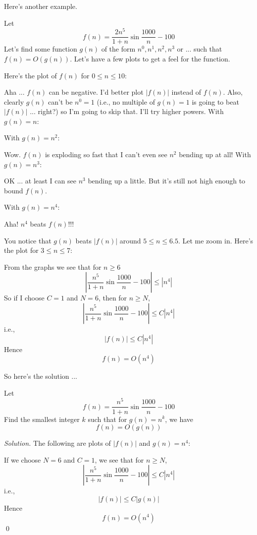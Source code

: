 Here's another example.

Let
\[
f(n) = \frac{2n^5}{1 + n} \sin \frac{1000}{n} - 100
\]
Let's find some function $g(n)$ of the form $n^0, n^1, n^2, n^3$ or ...
such that $f(n) = O(g(n))$.
Let's have a few plots to get a feel for the function.

Here's the plot of $f(n)$ for $0 \leq n \leq 10$:

Aha ... $f(n)$ can be negative.
I'd better plot $|f(n)|$ instead of $f(n)$.
Also, clearly $g(n)$ can't be $n^0 = 1$ (i.e., no multiple of
$g(n) = 1$ is going to beat $|f(n)|$ ... right?) 
so I'm going to skip that.
I'll try higher powers.
With $g(n) = n$:


With $g(n) = n^2$:

Wow. $f(n)$ is exploding so fast that I can't even see $n^2$ bending up at
all!
With $g(n) = n^3$:

OK ... at least I can see $n^3$ bending up a little. 
But it's still not high enough to bound $f(n)$.


With $g(n) = n^4$:

Aha! $n^4$ beats $f(n)$!!!

%

You notice that $g(n)$ beats $|f(n)|$ around 
$5 \leq n \leq 6.5$.
Let me zoom in.
Here's the plot for $3 \leq n \leq 7$:


From the graphs we see that for $n \geq 6$
\[
\left| 
\frac{n^5}{1 + n} \sin \frac{1000}{n} - 100
\right| 
\leq 
\left|
n^4
\right|
\]
So if I choose $C = 1$ and $N = 6$, then for $n \geq N$,
\[
\left|
\frac{n^5}{1 + n} \sin \frac{1000}{n} - 100
\right| 
\leq C
\left|
n^4
\right|
\]
i.e.,
\[
|f(n)| \leq C|n^4|
\]
Hence
\[
f(n) = O(n^4)
\]

So here's the solution ...

\newpage

\begin{eg}
Let 
\[ 
f(n) = \frac{n^5}{1 + n} \sin \frac{1000}{n} - 100
\]
Find the smallest integer $k$ such that for $g(n) = n^k$, we have
\[
f(n) = O(g(n))
\]
\end{eg}

\textit{Solution.}
The following are plots of $|f(n)|$ and $g(n) = n^4$:


If we choose $N = 6$ and $C = 1$,
we see that for $n \geq N$,
\[
\left|
\frac{n^5}{1 + n} \sin \frac{1000}{n} - 100
\right| 
\leq C
\left|
n^4
\right|
\]
i.e.,
\[
|f(n)| \leq C|g(n)|
\]
Hence
\[
f(n) = O(n^4)
\]
\qed

\newpage
\newpage
\newpage
\newpage
\newpage
\newpage
\newpage
\newpage
\newpage
